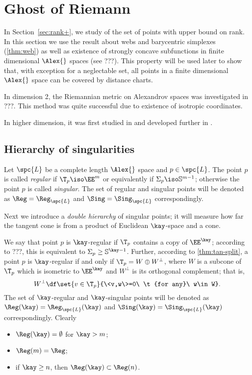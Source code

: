 \chapter{Ghost of Riemann}

In Section~\ref{sec:rank+},
we study of the set of points with upper bound on rank.
In this section we use the result about webs and barycentric simplexes (\ref{thm:web})
as well as existence of strongly concave subfunctions in finite dimensional $\Alex{}$ spaces (see ???).
This property will be used later to show that, with exception for a neglectable set, all points in a finite dimensional $\Alex{}$ space can be covered by distance charts.

In dimension 2, the Riemannian metric on Alexandrov spaces
was investigated in ???.
This method was quite successful due to existence of isotropic coordinates.

In higher dimension, it was first studied in \cite{otsu-shioya} and developed further in \cite{perelman:DC}.


\section{Hierarchy of singularities}

Let $\spc{L}$ be a complete length $\Alex{}$ space and $p\in\spc{L}$.
The point $p$ is called 
\emph{regular}
if $\T_p\iso\EE^m$
or equivalently 
if $\Sigma_p\iso\mathbb{S}^{m-1}$;
otherwise the point $p$ is called \emph{singular}.
The set of regular and singular points will be denoted as 
$\Reg=\Reg_{\spc{L}}$ 
and $\Sing=\Sing_{\spc{L}}$ correspondingly.

Next we introduce a  \emph{double hierarchy} of singular points;
it will measure how far the tangent cone is from a product of Euclidean $\kay$-space and a cone.

We say that point $p$ is $\kay$-regular if $\T_p$
contains a copy of $\EE^\kay$;
according to ???, this is equivalent to
$\Sigma_p\ge\mathbb{S}^{\kay-1}$.
Further, 
according to \ref{thm:tan-split},
a point $p$ is $\kay$-regular if and only if
$\T_p=W\oplus W^\bot$, where $W$ is a subcone of $\T_p$ which is isometric to $\EE^\kay$ 
and $W^\bot$ is its orthogonal complement; that is,
\[W^\bot
\df
\set{v\in\T_p}{\<v,w\>=0\ \t{for any}\ w\in W}.\]
The set of $\kay$-regular and $\kay$-singular points will be denoted as $\Reg(\kay)=\Reg_{\spc{L}}(\kay)$
and $\Sing(\kay)=\Sing_{\spc{L}}(\kay)$ correspondingly.
Clearly 
\begin{itemize}
\item $\Reg(\kay)=\emptyset$ for $\kay>m$;
\item $\Reg(m)=\Reg$;
\item if $\kay\ge n$, then $\Reg(\kay)\subset \Reg(n)$.
\end{itemize}
 
